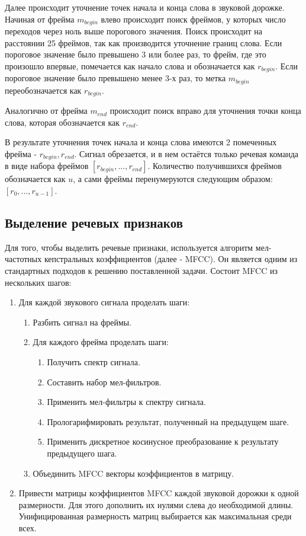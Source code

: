 Далее происходит уточнение точек начала и конца слова в звуковой дорожке. Начиная от фрейма $m_{begin}$ влево происходит поиск фреймов, у которых число переходов через ноль выше порогового значения. Поиск происходит на расстоянии 25 фреймов, так как производится уточнение границ слова. Если пороговое значение было превышено 3 или более раз, то фрейм, где это произошло впервые, помечается как начало слова и обозначается как $r_{begin}$. Если пороговое значение было превышено менее 3-х раз, то метка $m_{begin}$ переобозначается как $r_{begin}$.

Аналогично от фрейма $m_{end}$ происходит поиск вправо для уточнения точки конца слова, которая обозначается как $r_{end}$.

В результате уточнения точек начала и конца слова имеются 2 помеченных фрейма - $r_{begin}, r_{end}$. Сигнал обрезается, и в нем остаётся только речевая команда в виде набора фреймов $[r_{begin}, ... , r_{end}]$. Количество получившихся фреймов обозначается как $u$, а сами фреймы перенумеруются следующим образом: $[r_0, ... , r_{u-1}]$.

\subsection{Выделение речевых признаков}
Для того, чтобы выделить речевые признаки, используется алгоритм мел-частотных кепстральных коэффициентов \cite{MFCC} (далее - MFCC). Он является одним из стандартных подходов к решению поставленной задачи. Состоит MFCC из нескольких шагов:
\begin{enumerate}
	\item Для каждой звукового сигнала проделать шаги:
	\begin{enumerate}
		\item Разбить сигнал на фреймы.
		\item Для каждого фрейма проделать шаги:
		\begin{enumerate}
			\item Получить спектр сигнала.
			\item Составить набор мел-фильтров.
			\item Применить мел-фильтры к спектру сигнала.
			\item Прологарифмировать результат, полученный на предыдущем шаге.
			\item Применить дискретное косинусное преобразование к результату предыдущего шага.
		\end{enumerate}
		\item Объединить MFCC векторы коэффициентов в матрицу.
	\end{enumerate}

	\item Привести матрицы коэффициентов MFCC каждой звуковой дорожки к одной размерности. Для этого дополнить их нулями слева до необходимой длины. Унифицированная размерность матриц выбирается как максимальная среди всех.
\end{enumerate}
 
